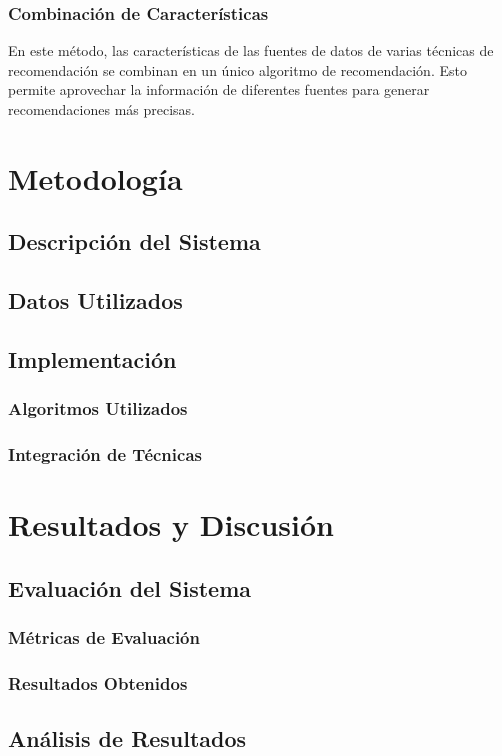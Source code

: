 \documentclass[a4paper,12pt]{report}
\begin{document}
        \subsection{Combinación de Características}
En este método, las características de las fuentes de datos de varias técnicas de recomendación se combinan en un único algoritmo de recomendación. Esto permite aprovechar la información de diferentes fuentes para generar recomendaciones más precisas.
\chapter{Metodología}
    \section{Descripción del Sistema}
    \section{Datos Utilizados}
    \section{Implementación}
        \subsection{Algoritmos Utilizados}
        \subsection{Integración de Técnicas}

\chapter{Resultados y Discusión}
    \section{Evaluación del Sistema}
        \subsection{Métricas de Evaluación}
        \subsection{Resultados Obtenidos}
    \section{Análisis de Resultados}
\end{document}
